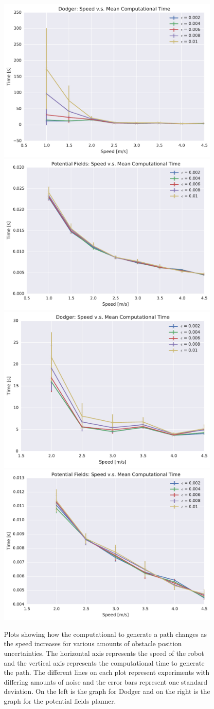 \documentclass[letterpaper, 10pt, conference]{ieeeconf}
\begin{document}
\begin{figure}[h!]
    \centering
    \includegraphics[width=0.48\linewidth]{figs/planner_mean_times_0}
    \includegraphics[width=0.48\linewidth]{figs/pf_mean_times_0} \\
    \includegraphics[width=0.48\linewidth]{figs/planner_small_mean_times_0}
    \includegraphics[width=0.48\linewidth]{figs/pf_small_mean_times_0}

    \caption{Plots showing how the computational to generate a path changes as
        the speed increases for various amounts of obstacle position
        uncertainties.  The horizontal axis represents the speed of the robot
        and the vertical axis represents the computational time to generate the
        path. The different lines on each plot represent experiments with
        differing amounts of noise and the error bars represent one standard
        deviation.  On the left is the graph for Dodger and on the right is the
    graph for the potential fields planner.}

    \label{fig:plot_comp_time}
\end{figure}
\end{document}
